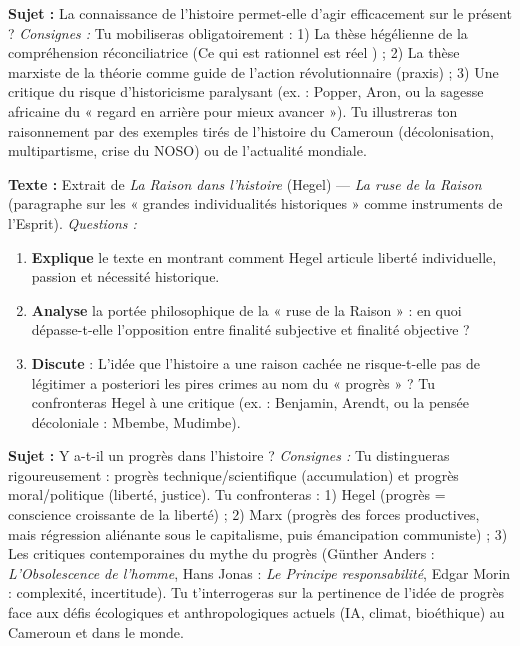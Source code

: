 \documentclass[11pt]{article}
\newcounter{popsec}
\newcounter{popsub}
\newcommand{\courssub}[1]{%
  \stepcounter{popsub}%
  \par\vspace{9pt}\noindent{\popxbold\fontsize{11.5}{13}\selectfont\color{popink}{\color{poporange}\thepopsec.\thepopsub}\hspace{6pt}#1}\par\nopagebreak\vspace{4pt}
}
\begin{document}
\courssub{Je me prépare au Bac}

\begin{exercice}
\textbf{Sujet :} \guillemotleft La connaissance de l'histoire permet-elle d'agir efficacement sur le présent ? \guillemotright
\textit{Consignes :} Tu mobiliseras obligatoirement : 1) La thèse hégélienne de la compréhension réconciliatrice (\guillemotleft Ce qui est rationnel est réel \guillemotright) ; 2) La thèse marxiste de la théorie comme guide de l'action révolutionnaire (praxis) ; 3) Une critique du risque d'historicisme paralysant (ex. : Popper, Aron, ou la sagesse africaine du « regard en arrière pour mieux avancer »). Tu illustreras ton raisonnement par des exemples tirés de l'histoire du Cameroun (décolonisation, multipartisme, crise du NOSO) ou de l'actualité mondiale.
\end{exercice}

\begin{exercice}
\textbf{Texte :} Extrait de \emph{La Raison dans l'histoire} (Hegel) — \emph{La ruse de la Raison} (paragraphe sur les « grandes individualités historiques » comme instruments de l'Esprit).
\textit{Questions :}
\begin{enumerate}
\item \textbf{Explique} le texte en montrant comment Hegel articule liberté individuelle, passion et nécessité historique.
\item \textbf{Analyse} la portée philosophique de la « ruse de la Raison » : en quoi dépasse-t-elle l'opposition entre finalité subjective et finalité objective ?
\item \textbf{Discute} : L'idée que l'histoire a une raison cachée ne risque-t-elle pas de légitimer a posteriori les pires crimes au nom du « progrès » ? Tu confronteras Hegel à une critique (ex. : Benjamin, Arendt, ou la pensée décoloniale : Mbembe, Mudimbe).
\end{enumerate}
\end{exercice}

\begin{exercice}
\textbf{Sujet :} \guillemotleft Y a-t-il un progrès dans l'histoire ? \guillemotright
\textit{Consignes :} Tu distingueras rigoureusement : progrès technique/scientifique (accumulation) et progrès moral/politique (liberté, justice). Tu confronteras : 1) Hegel (progrès = conscience croissante de la liberté) ; 2) Marx (progrès des forces productives, mais régression aliénante sous le capitalisme, puis émancipation communiste) ; 3) Les critiques contemporaines du mythe du progrès (Günther Anders : \emph{L'Obsolescence de l'homme}, Hans Jonas : \emph{Le Principe responsabilité}, Edgar Morin : complexité, incertitude). Tu t'interrogeras sur la pertinence de l'idée de progrès face aux défis écologiques et anthropologiques actuels (IA, climat, bioéthique) au Cameroun et dans le monde.
\end{exercice}
\end{document}

